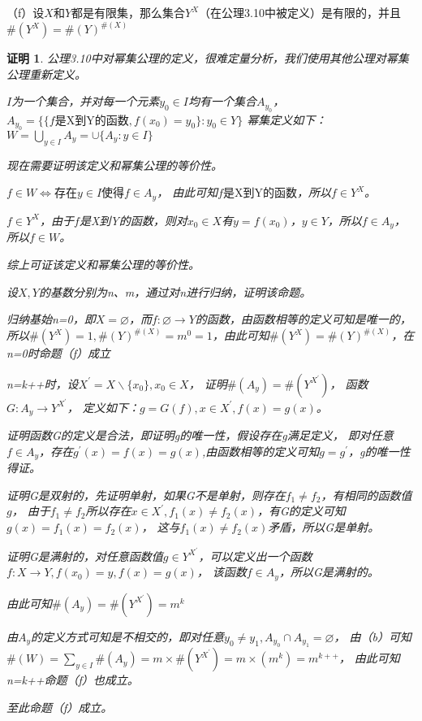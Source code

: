 \documentclass{article}
\theoremstyle{mystyle}
\theoremstyle{zproofstyle}
\newtheorem*{zproof}{证明}
\begin{document}
  （f）设$X$和$Y$都是有限集，那么集合$Y^X$（在公理3.10中被定义）是有限的，并且$\#(Y^X)=\#(Y)^{\#(X)}$
  \begin{zproof}
    公理3.10中对幂集公理的定义，很难定量分析，我们使用其他公理对幂集公理重新定义。


    $I$为一个集合，并对每一个元素$y_0 \in I$均有一个集合$A_{y_0}$，
    $A_{y_0} = \{ \{f\text{是X到Y的函数}, f(x_0)=y_0\}: y_0 \in Y\}$
    幂集定义如下：
    $W=\bigcup\limits_{y \in I}A_{y} = \cup\{A_y : y \in I\}$

    现在需要证明该定义和幂集公理的等价性。

    $f \in W \Leftrightarrow \text{存在} y \in I \text{使得} f \in A_y$，
    由此可知$f\text{是X到Y的函数}$，所以$f \in Y^X$。

    $f \in Y^X$，由于$f$是X到Y的函数，则对$x_0 \in X$有$y=f(x_0)$，$y \in Y$，所以$f \in A_y$，
    所以$f \in W$。

    综上可证该定义和幂集公理的等价性。


    设$X,Y$的基数分别为n、m，通过对n进行归纳，证明该命题。

    归纳基始n=0，即$X = \varnothing$，而$f: \varnothing \rightarrow Y$的函数，由函数相等的定义可知是唯一的，
    所以$\#(Y^X)=1,\#(Y)^{\#(X)}=m^0=1$，由此可知$\#(Y^X)=\#(Y)^{\#(X)}$，在n=0时命题（f）成立

    n=k++时，设$X^\prime=X \backslash \{x_0\}, x_0 \in X$，
    证明$\#(A_y)=\#(Y^{X^\prime})$，
    函数$G: A_y \rightarrow Y^{X^\prime}$，
    定义如下：$ g=G(f), x \in X^\prime, f(x)=g(x)$。

    证明函数G的定义是合法，即证明g的唯一性，假设存在g满足定义，
    即对任意$f \in A_y$，存在$g^\prime(x)=f(x)=g(x)$,由函数相等的定义可知$g=g^\prime$，g的唯一性得证。

    证明G是双射的，先证明单射，如果G不是单射，则存在$f_1 \neq f_2$，有相同的函数值$g$，
    由于$f_1 \neq f_2$所以存在$x \in X^\prime, f_1(x) \neq f_2(x)$，有G的定义可知$g(x)=f_1(x)=f_2(x)$，
    这与$f_1(x) \neq f_2(x)$矛盾，所以G是单射。

    证明G是满射的，对任意函数值$g \in Y^{X^\prime}$，可以定义出一个函数$f: X \rightarrow Y, f(x_0)=y, f(x)=g(x)$，
    该函数$f \in A_y$，所以G是满射的。

    由此可知$\#(A_y)=\#(Y^{X^\prime})=m^k$

    由$A_y$的定义方式可知是不相交的，即对任意$y_0 \neq y_1, A_{y_0} \cap A_{y_1}=\varnothing$，
    由（b）可知$\#(W)=\sum_{y \in I} \#(A_y) = m \times \#(Y^{X^\prime}) = m \times (m^k) = m^{k++} $，
    由此可知n=k++命题（f）也成立。

    至此命题（f）成立。
  \end{zproof}
\end{document}
